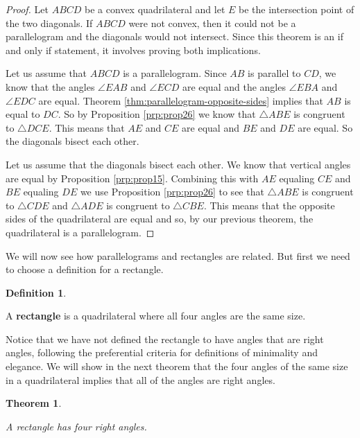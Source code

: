 \documentclass[
]{book}
\newtheorem{theorem}{Theorem}[chapter]
\theoremstyle{definition}
\newtheorem{definition}{Definition}[chapter]
\theoremstyle{definition}
\theoremstyle{definition}
\theoremstyle{definition}
\theoremstyle{remark}
\begin{document}
\begin{proof}

Let \(ABCD\) be a convex quadrilateral and let \(E\) be the intersection point of the two diagonals. If \(ABCD\) were not convex, then it could not be a parallelogram and the diagonals would not intersect. Since this theorem is an if and only if statement, it involves proving both implications.

Let us assume that \(ABCD\) is a parallelogram. Since \(AB\) is parallel to \(CD\), we know that the angles \(\angle EAB\) and \(\angle ECD\) are equal and the angles \(\angle EBA\) and \(\angle EDC\) are equal. Theorem \ref{thm:parallelogram-opposite-sides} implies that \(AB\) is equal to \(DC\). So by Proposition \ref{prp:prop26} we know that \(\triangle ABE\) is congruent to \(\triangle DCE\). This means that \(AE\) and \(CE\) are equal and \(BE\) and \(DE\) are equal. So the diagonals bisect each other.

Let us assume that the diagonals bisect each other. We know that vertical angles are equal by Proposition \ref{prp:prop15}. Combining this with \(AE\) equaling \(CE\) and \(BE\) equaling \(DE\) we use Proposition \ref{prp:prop26} to see that \(\triangle ABE\) is congruent to \(\triangle CDE\) and \(\triangle ADE\) is congruent to \(\triangle CBE\). This means that the opposite sides of the quadrilateral are equal and so, by our previous theorem, the quadrilateral is a parallelogram.

\end{proof}

We will now see how parallelograms and rectangles are related. But first we need to choose a definition for a rectangle.

\begin{definition}
\protect\hypertarget{def:unlabeled-div-163}{}\label{def:unlabeled-div-163}

A \textbf{rectangle} is a quadrilateral where all four angles are the same size.

\end{definition}

Notice that we have not defined the rectangle to have angles that are right angles, following the preferential criteria for definitions of minimality and elegance. We will show in the next theorem that the four angles of the same size in a quadrilateral implies that all of the angles are right angles.

\begin{theorem}
\protect\hypertarget{thm:unlabeled-div-164}{}\label{thm:unlabeled-div-164}

A rectangle has four right angles.

\end{theorem}
\end{document}
